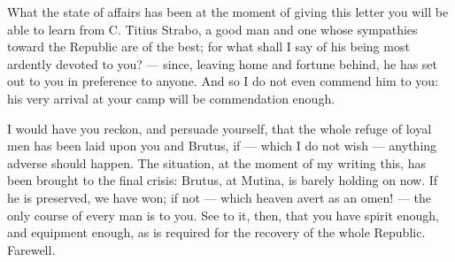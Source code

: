 

 What the state of affairs has been at the moment of giving this letter you will be able to learn from C. Titius Strabo, a good man and one whose sympathies toward the Republic are of the best; for what shall I say of his being most ardently devoted to you? --- since, leaving home and fortune behind, he has set out to you in preference to anyone. And so I do not even commend him to you: his very arrival at your camp will be commendation enough.

 I would have you reckon, and persuade yourself, that the whole refuge of loyal men has been laid upon you and Brutus, if --- which I do not wish --- anything adverse should happen. The situation, at the moment of my writing this, has been brought to the final crisis: Brutus, at Mutina, is barely holding on now. If he is preserved, we have won; if not --- which heaven avert as an omen! --- the only course of every man is to you. See to it, then, that you have spirit enough, and equipment enough, as is required for the recovery of the whole Republic. Farewell.
